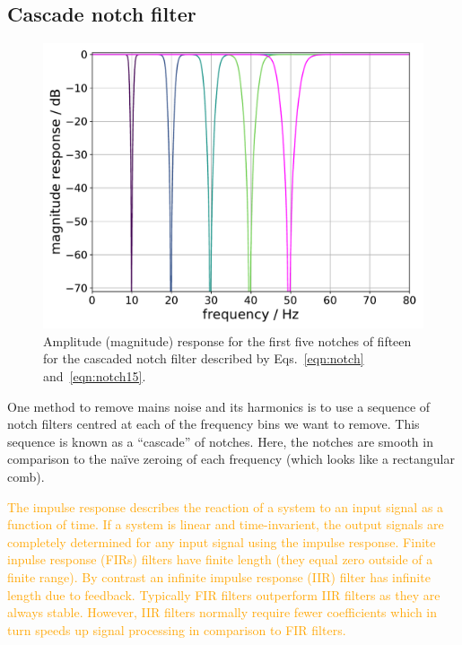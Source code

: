 \documentclass[aps,pra,superscriptaddress,reprint,nofootinbib]{revtex4-1}
\newcommand{\han}{\textcolor{orange}}
\begin{document}
\subsection{Cascade notch filter}

\label{sec:notch}
\begin{figure}
\begin{center}
\includegraphics[width=.45\textwidth]{figures/cascaded_notch_response_plot.pdf}
\end{center}
\caption{\label{fig:notchMagResponse}
Amplitude (magnitude) response for the first five notches of fifteen for the cascaded notch filter described by Eqs.~\ref{eqn:notch} and~\ref{eqn:notch15}. 
}
\end{figure}

One method to remove mains noise and its harmonics is to use a sequence of notch filters centred at each of the frequency bins we want to remove. This sequence is known as a ``cascade'' of notches. Here, the notches are smooth in comparison to the na{\"i}ve zeroing of each frequency (which looks like a rectangular comb). 

\han{The impulse response describes the reaction of a system to an input signal as a function of time. 
If a system is linear and time-invarient, the output signals are completely determined for any input signal using the impulse response. 
Finite inpulse response (FIRs) filters have finite length (they equal zero outside of a finite range). 
By contrast an infinite impulse response (IIR) filter has infinite length due to feedback. 
Typically FIR filters outperform IIR filters as they are always stable. 
However, IIR filters normally require fewer coefficients which in turn speeds up signal processing in comparison to FIR filters. 
}
\end{document}

